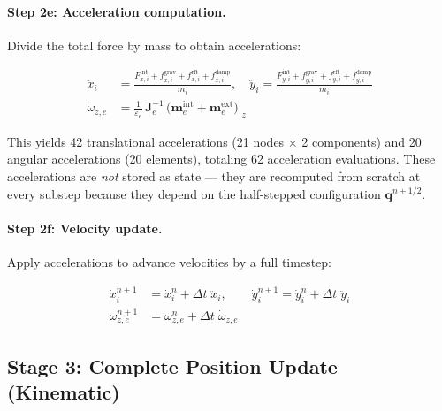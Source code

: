 \documentclass[11pt]{article}
\newcommand{\vect}[1]{\mathbf{#1}}
\newcommand{\mat}[1]{\mathbf{#1}}
\begin{document}
\paragraph{Step 2e: Acceleration computation.}
Divide the total force by mass to obtain accelerations:

\begin{subequations}
\label{eq:accelerations}
\begin{align}
  \ddot{x}_i &= \frac{F_{x,i}^{\text{int}} + f_{x,i}^{\text{grav}} + f_{x,i}^{\text{rft}} + f_{x,i}^{\text{damp}}}{m_i},
  \quad
  \ddot{y}_i = \frac{F_{y,i}^{\text{int}} + f_{y,i}^{\text{grav}} + f_{y,i}^{\text{rft}} + f_{y,i}^{\text{damp}}}{m_i}
  \label{eq:acc-translational} \\[4pt]
  \dot{\omega}_{z,e} &= \frac{1}{\varepsilon_e}\,\mat{J}_e^{-1}\,
    \bigl(\vect{m}_e^{\text{int}} + \vect{m}_e^{\text{ext}}\bigr)\bigg|_z
  \label{eq:acc-angular}
\end{align}
\end{subequations}

\noindent
This yields 42 translational accelerations (21 nodes $\times$ 2 components) and 20 angular accelerations (20 elements), totaling 62 acceleration evaluations.
These accelerations are \emph{not} stored as state --- they are recomputed from scratch at every substep because they depend on the half-stepped configuration $\vect{q}^{n+1/2}$.

\paragraph{Step 2f: Velocity update.}
Apply accelerations to advance velocities by a full timestep:

\begin{subequations}
\label{eq:vel-update}
\begin{align}
  \dot{x}_i^{n+1} &= \dot{x}_i^n + \Delta t\;\ddot{x}_i, \qquad
  \dot{y}_i^{n+1} = \dot{y}_i^n + \Delta t\;\ddot{y}_i
  \label{eq:vel-update-trans} \\[4pt]
  \omega_{z,e}^{n+1} &= \omega_{z,e}^n + \Delta t\;\dot{\omega}_{z,e}
  \label{eq:vel-update-rot}
\end{align}
\end{subequations}

\subsection{Stage 3: Complete Position Update (Kinematic)}
\label{sec:stage3}
\end{document}
